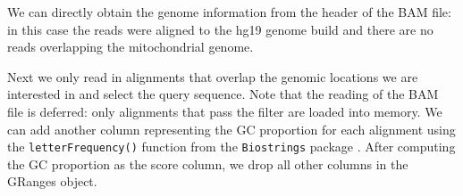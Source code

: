 \documentclass[]{article}
\newenvironment{Shaded}{\begin{snugshade}}{\end{snugshade}}
\newcommand{\KeywordTok}[1]{\textcolor[rgb]{0.13,0.29,0.53}{\textbf{#1}}}
\newcommand{\DataTypeTok}[1]{\textcolor[rgb]{0.13,0.29,0.53}{#1}}
\newcommand{\StringTok}[1]{\textcolor[rgb]{0.31,0.60,0.02}{#1}}
\newcommand{\OtherTok}[1]{\textcolor[rgb]{0.56,0.35,0.01}{#1}}
\newcommand{\OperatorTok}[1]{\textcolor[rgb]{0.81,0.36,0.00}{\textbf{#1}}}
\newcommand{\NormalTok}[1]{#1}
\begin{document}
We can directly obtain the genome information from the header of the BAM
file: in this case the reads were aligned to the hg19 genome build and
there are no reads overlapping the mitochondrial genome.

\begin{Shaded}
\end{Shaded}

Next we only read in alignments that overlap the genomic locations we
are interested in and select the query sequence. Note that the reading
of the BAM file is deferred: only alignments that pass the filter are
loaded into memory. We can add another column representing the GC
proportion for each alignment using the \texttt{letterFrequency()}
function from the \texttt{Biostrings} package \cite{R-biostrings}. After
computing the GC proportion as the score column, we drop all other
columns in the GRanges object.

\begin{Shaded}
\end{Shaded}
\end{document}
